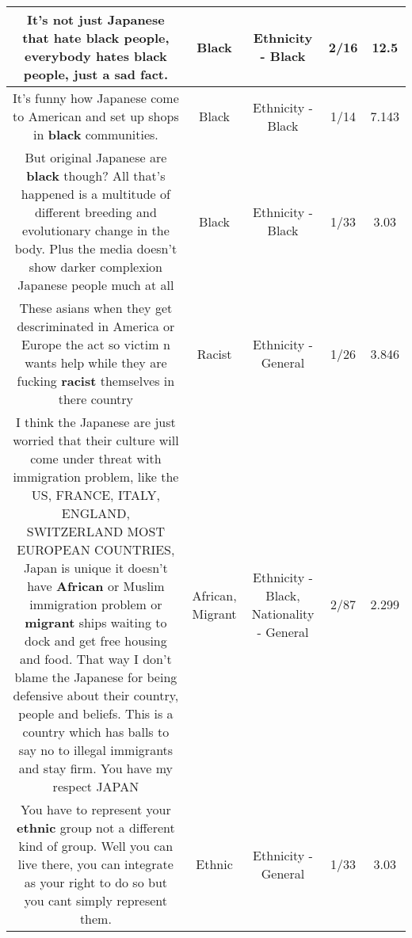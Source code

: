 \documentclass[11pt]{article}
\newlength\mylength
\begin{document}
\begin{center}
\begin{longtable}{|C{.65\mylength}|C{.30\mylength}|C{.12\mylength}|C{.12\mylength}|C{.12\mylength}|}
  \small It's not just Japanese that hate \textbf{black} people, everybody hates \textbf{black} people, just a sad fact.\normalsize   & Black & Ethnicity - Black & 2/16 & 12.5 \\  \hline
  \small It's funny how Japanese come to American and set up shops in \textbf{black} communities.\normalsize   & Black & Ethnicity - Black & 1/14 & 7.143 \\  \hline
  \small But original Japanese are \textbf{black} though? All that's happened is a multitude of different breeding and evolutionary change in the body. Plus the media doesn't show darker complexion Japanese people much at all\normalsize   & Black & Ethnicity - Black & 1/33 & 3.03 \\  \hline
  \small These asians when they get descriminated in America or Europe the act so victim n wants help while they are fucking \textbf{racist} themselves in there country\normalsize   & Racist & Ethnicity - General & 1/26 & 3.846 \\  \hline
  \small I think the Japanese are just worried that their culture will come under threat with immigration problem, like the US, FRANCE, ITALY, ENGLAND, SWITZERLAND MOST EUROPEAN COUNTRIES, Japan is unique it doesn't have \textbf{African} or Muslim immigration problem or \textbf{migrant} ships waiting to dock and get free housing and food. That way I don't blame the Japanese for being defensive about their country, people and beliefs. This is a country which has balls to say no to illegal immigrants and stay firm. You have my respect JAPAN\normalsize   & African, Migrant & Ethnicity - Black, Nationality - General & 2/87 & 2.299 \\  \hline
  \small You have to represent your \textbf{ethnic} group not a different kind of group. Well you can live there, you can integrate as your right to do so but you cant simply represent them.\normalsize   & Ethnic & Ethnicity - General & 1/33 & 3.03 \\  \hline

\end{longtable}
\end{center}
\end{document}
